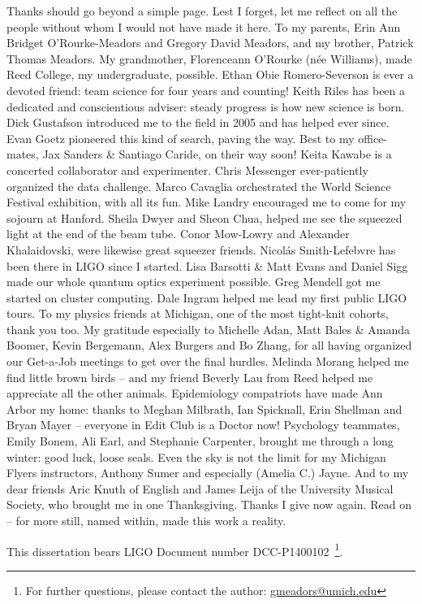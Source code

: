 \documentclass[leqno,twoside]{report}
\theoremstyle{plain}
\theoremstyle{definition}
\theoremstyle{remark}
\numberwithin{theorem}{chapter}        %
\begin{document}
Thanks should go beyond a simple page. 
Lest I forget, let me reflect on all the people without whom I would not have made it here. 
To my parents, Erin Ann Bridget O'Rourke-Meadors and Gregory David Meadors, and my brother, Patrick Thomas Meadors. 
My grandmother, Florenceann O'Rourke (n\'{e}e Williams), made Reed College, my undergraduate, possible. 
Ethan Obie Romero-Severson is ever a devoted friend: team science for four years and counting!
Keith Riles has been a dedicated and conscientious adviser: steady progress is how new science is born.
Dick Gustafson introduced me to the field in 2005 and has helped ever since.
Evan Goetz pioneered this kind of search, paving the way.
Best to my office-mates, Jax Sanders \& Santiago Caride, on their way soon!
Keita Kawabe is a concerted collaborator and experimenter.
Chris Messenger ever-patiently organized the data challenge.
Marco Cavaglia orchestrated the World Science Festival exhibition, with all its fun.
Mike Landry encouraged me to come for my sojourn at Hanford.
Sheila Dwyer and Sheon Chua, helped me see the squeezed light at the end of the beam tube.
Conor Mow-Lowry and Alexander Khalaidovski, were likewise great squeezer friends. 
Nicol\'{a}s Smith-Lefebvre has been there in LIGO since I started.
Lisa Barsotti \& Matt Evans and Daniel Sigg made our whole quantum optics experiment possible.
Greg Mendell got me started on cluster computing.
Dale Ingram helped me lead my first public LIGO tours.
To my physics friends at Michigan, one of the most tight-knit cohorts, thank you too.
My gratitude especially to Michelle Adan, Matt Bales \& Amanda Boomer, Kevin Bergemann, Alex Burgers and Bo Zhang, for all having organized our Get-a-Job meetings to get over the final hurdles.
Melinda Morang helped me find little brown birds -- and my friend Beverly Lau from Reed helped me appreciate all the other animals.
Epidemiology compatriots have made Ann Arbor my home: thanks to Meghan Milbrath, Ian Spicknall, Erin Shellman and Bryan Mayer -- everyone in Edit Club is a Doctor now!
Psychology teammates, Emily Bonem, Ali Earl, and Stephanie Carpenter, brought me through a long winter: good luck, loose seals.
Even the sky is not the limit for my Michigan Flyers instructors, Anthony Sumer and especially (Amelia C.) Jayne.
And to my dear friends Aric Knuth of English and James Leija of the University Musical Society, who brought me in one Thanksgiving.
Thanks I give now again.
Read on -- for more still, named within, made this work a reality.

This dissertation bears LIGO Document number DCC-P1400102~\footnote{For further questions, please contact the author: \href{mailto:gmeadors@umich.edu}{gmeadors@umich.edu}}.
\end{document}
